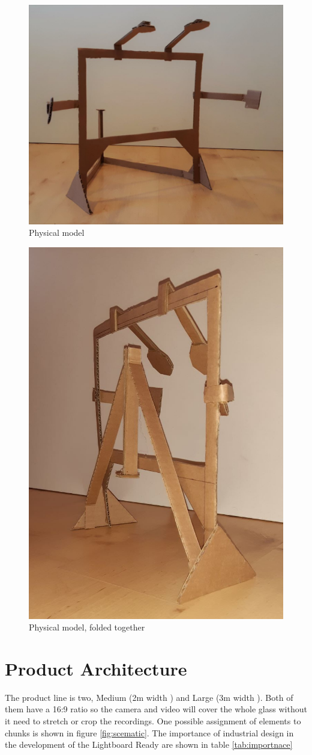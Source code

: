 \documentclass[a4paper]{jpconf}
\begin{document}
\begin{figure}
	\centering 
	\includegraphics[width=0.7\linewidth]{pappi_1.jpg}
	\caption{Physical model}
	\label{fig:pappi_1}
\end{figure}
\begin{figure}
	\centering
	\includegraphics[width=0.7\linewidth]{pappi_3.jpg}
	\caption{Physical model, folded together}
	\label{fig:pappi_3}
\end{figure}
\section{Product Architecture}
The product line is two, Medium (2m width ) and Large (3m width ). Both of them have a 16:9 ratio so the camera and video will cover the whole glass without it need to stretch or crop the recordings.
One possible assignment of elements to chunks is shown in figure \ref{fig:scematic}.
The importance of industrial design in the development of the Lightboard Ready are shown in table \ref{tab:importnace}
\end{document}
